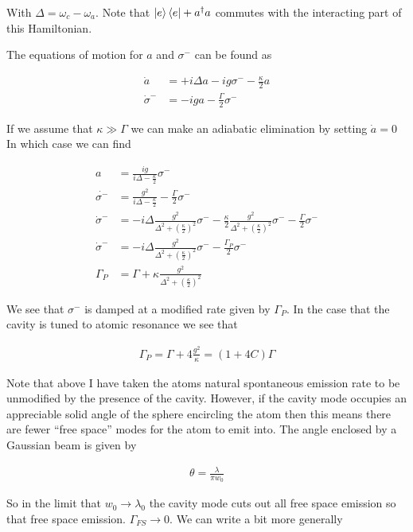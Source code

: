 \documentclass[12pt]{article}
\begin{document}
With $\Delta = \omega_c-\omega_a$.
Note that $\ket{e}\bra{e}+a^{\dag}a$ commutes with the interacting part of this Hamiltonian.

The equations of motion for $a$ and $\sigma^-$ can be found as

\begin{align}
\dot{a} &= +i\Delta a -ig \sigma^- - \frac{\kappa}{2}a\\
\dot{\sigma}^- &= -iga - \frac{\Gamma}{2}\sigma^-
\end{align}

If we assume that $\kappa\gg \Gamma$ we can make an adiabatic elimination by setting $\dot{a}=0$ In which case we can find

\begin{align}
a &= \frac{ig}{i\Delta - \frac{\kappa}{2}} \sigma^-\\
\dot{\sigma^-} &= \frac{g^2}{i\Delta - \frac{\kappa}{2}} - \frac{\Gamma}{2}\sigma^-\\
\dot{\sigma}^- &= -i\Delta \frac{g^2}{\Delta^2 + \left(\frac{\kappa}{2}\right)^2}\sigma^- - \frac{\kappa}{2} \frac{g^2}{\Delta^2 + \left(\frac{\kappa}{2} \right)^2} \sigma^- - \frac{\Gamma}{2} \sigma^-\\
\dot{\sigma}^- &= -i \Delta \frac{g^2}{\Delta^2 + \left(\frac{\kappa}{2}\right)^2} \sigma^- - \frac{\Gamma_P}{2}\sigma^-\\
\Gamma_P &= \Gamma + \kappa \frac{g^2}{\Delta^2 + \left(\frac{\kappa}{2} \right)^2}
\end{align}

We see that $\sigma^-$ is damped at a modified rate given by $\Gamma_P$. In the case that the cavity is tuned to atomic resonance we see that 

\begin{align}
\Gamma_P = \Gamma + 4 \frac{g^2}{\kappa} = \left(1 + 4C\right) \Gamma
\end{align}

Note that above I have taken the atoms natural spontaneous emission rate to be unmodified by the presence of the cavity. However, if the cavity mode occupies an appreciable solid angle of the sphere encircling the atom then this means there are fewer ``free space'' modes for the atom to emit into. The angle enclosed by a Gaussian beam is given by

\begin{align}
\theta = \frac{\lambda}{\pi w_0}
\end{align}

So in the limit that $w_0 \rightarrow \lambda_0$ the cavity mode cuts out all free space emission so that free space emission. $\Gamma_{FS} \rightarrow 0$. We can write a bit more generally
\end{document}
